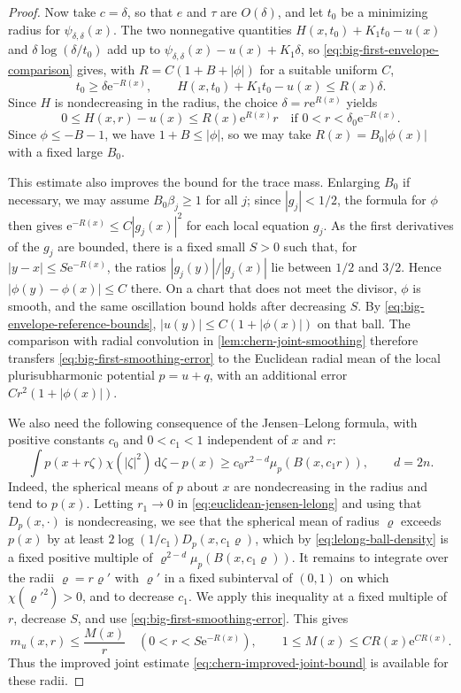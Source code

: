 \begin{proof}
Now take $c=\delta$, so that $e$ and $\tau$ are $O(\delta)$, and let $t_0$ be a minimizing radius for $\psi_{\delta,\delta}(x)$. The two nonnegative quantities $H(x,t_0)+K_1t_0-u(x)$ and $\delta\log(\delta/t_0)$ add up to $\psi_{\delta,\delta}(x)-u(x)+K_1\delta$, so \eqref{eq:big-first-envelope-comparison} gives, with $R=C(1+B+|\phi|)$ for a suitable uniform $C$,
\[
 t_0\geq\delta\mathrm e^{-R(x)},\qquad
 H(x,t_0)+K_1t_0-u(x)\leq R(x)\delta.
\]
Since $H$ is nondecreasing in the radius, the choice $\delta=r\mathrm e^{R(x)}$ yields
\begin{equation}\label{eq:big-first-smoothing-error}
 0\leq H(x,r)-u(x)\leq R(x)\mathrm e^{R(x)}r
 \quad\text{if }0<r<\delta_0\mathrm e^{-R(x)}.
\end{equation}
Since $\phi\leq-B-1$, we have $1+B\leq|\phi|$, so we may take $R(x)=B_0|\phi(x)|$ with a fixed large $B_0$.

This estimate also improves the bound for the trace mass. Enlarging $B_0$ if necessary, we may assume $B_0\beta_j\geq1$ for all $j$; since $|g_j|<1/2$, the formula for $\phi$ then gives $\mathrm e^{-R(x)}\leq C|g_j(x)|^2$ for each local equation $g_j$. As the first derivatives of the $g_j$ are bounded, there is a fixed small $S>0$ such that, for $|y-x|\leq S\mathrm e^{-R(x)}$, the ratios $|g_j(y)|/|g_j(x)|$ lie between $1/2$ and $3/2$. Hence $|\phi(y)-\phi(x)|\leq C$ there. On a chart that does not meet the divisor, $\phi$ is smooth, and the same oscillation bound holds after decreasing $S$. By \eqref{eq:big-envelope-reference-bounds}, $|u(y)|\leq C(1+|\phi(x)|)$ on that ball. The comparison with radial convolution in \cref{lem:chern-joint-smoothing} therefore transfers \eqref{eq:big-first-smoothing-error} to the Euclidean radial mean of the local plurisubharmonic potential $p=u+q$, with an additional error $Cr^2(1+|\phi(x)|)$.

We also need the following consequence of the Jensen--Lelong formula, with positive constants $c_0$ and $0<c_1<1$ independent of $x$ and $r$:
\[
 \int p(x+r\zeta)\chi(|\zeta|^2)\,\mathrm d\zeta-p(x)
        \geq c_0 r^{2-d}\mu_p(B(x,c_1r)),
 \qquad d=2n.
\]
Indeed, the spherical means of $p$ about $x$ are nondecreasing in the radius and tend to $p(x)$. Letting $r_1\to0$ in \eqref{eq:euclidean-jensen-lelong} and using that $D_p(x,\cdot)$ is nondecreasing, we see that the spherical mean of radius $\varrho$ exceeds $p(x)$ by at least $2\log(1/c_1)D_p(x,c_1\varrho)$, which by \eqref{eq:lelong-ball-density} is a fixed positive multiple of $\varrho^{2-d}\mu_p(B(x,c_1\varrho))$. It remains to integrate over the radii $\varrho=r\varrho'$ with $\varrho'$ in a fixed subinterval of $(0,1)$ on which $\chi(\varrho'^2)>0$, and to decrease $c_1$. We apply this inequality at a fixed multiple of $r$, decrease $S$, and use \eqref{eq:big-first-smoothing-error}. This gives
\begin{equation}\label{eq:big-improved-trace-mass}
 m_u(x,r)\leq\frac{M(x)}r\quad(0<r<S\mathrm e^{-R(x)}),
 \qquad 1\leq M(x)\leq C R(x)\mathrm e^{CR(x)}.
\end{equation}
Thus the improved joint estimate \eqref{eq:chern-improved-joint-bound} is available for these radii.


\end{proof}
